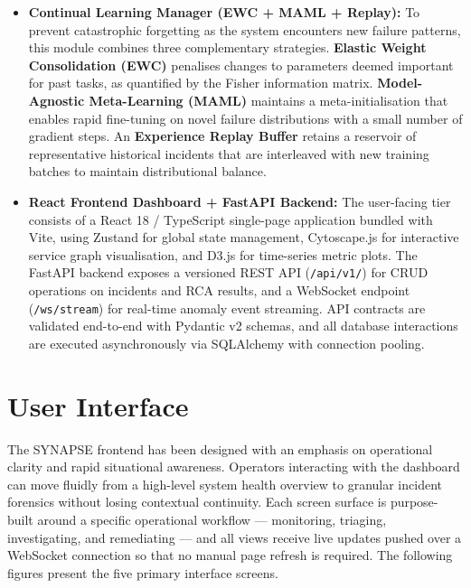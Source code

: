 \begin{itemize}
    \item \textbf{Continual Learning Manager (EWC + MAML + Replay):}
    To prevent catastrophic forgetting as the system encounters new failure patterns, this module combines three complementary strategies. \textbf{Elastic Weight Consolidation (EWC)} penalises changes to parameters deemed important for past tasks, as quantified by the Fisher information matrix. \textbf{Model-Agnostic Meta-Learning (MAML)} maintains a meta-initialisation that enables rapid fine-tuning on novel failure distributions with a small number of gradient steps. An \textbf{Experience Replay Buffer} retains a reservoir of representative historical incidents that are interleaved with new training batches to maintain distributional balance.

    \item \textbf{React Frontend Dashboard + FastAPI Backend:}
    The user-facing tier consists of a React 18 / TypeScript single-page application bundled with Vite, using Zustand for global state management, Cytoscape.js for interactive service graph visualisation, and D3.js for time-series metric plots. The FastAPI backend exposes a versioned REST API (\texttt{/api/v1/}) for CRUD operations on incidents and RCA results, and a WebSocket endpoint (\texttt{/ws/stream}) for real-time anomaly event streaming. API contracts are validated end-to-end with Pydantic v2 schemas, and all database interactions are executed asynchronously via SQLAlchemy with connection pooling.

\end{itemize}

\section{User Interface}

\hspace*{0.3in} The SYNAPSE frontend has been designed with an emphasis on operational clarity and rapid situational awareness. Operators interacting with the dashboard can move fluidly from a high-level system health overview to granular incident forensics without losing contextual continuity. Each screen surface is purpose-built around a specific operational workflow — monitoring, triaging, investigating, and remediating — and all views receive live updates pushed over a WebSocket connection so that no manual page refresh is required. The following figures present the five primary interface screens.

